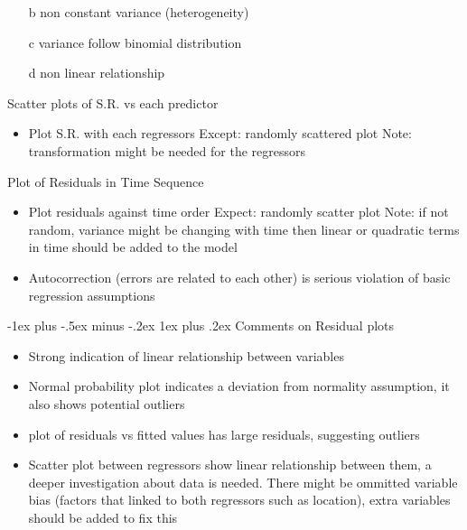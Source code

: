 \documentclass[a4paper,12pt,landscape]{article}
\makeatletter
\renewcommand{\subsubsection}{\@startsection{subsubsection}{3}{0mm}%
                                {-1ex plus -.5ex minus -.2ex}%
                                {1ex plus .2ex}%
                                {\normalfont\small\bfseries\color{violet}}}
\makeatother
\begin{document}
\begin{multicols}{3}
\begin{itemize}
            \item[b] non constant variance (heterogeneity)
            \item[c] variance follow binomial distribution
            \item[d] non linear relationship
        \end{itemize}
        Scatter plots of S.R. vs each predictor
        \begin{itemize}
            \item Plot S.R. with each regressors
                \subitem Except: randomly scattered plot
                \subitem Note: transformation might be needed for the regressors
        \end{itemize}
        Plot of Residuals in Time Sequence
        \begin{itemize}
            \item Plot residuals against time order
            \subitem Expect: randomly scatter plot
            \subitem Note: if not random, variance might be changing with time then linear or quadratic terms in time should be added to the model
        \item Autocorrection (errors are related to each other) is serious violation of basic regression assumptions
        \end{itemize}

        \subsubsection{Comments on Residual plots}
        \begin{itemize}
            \item Strong indication of linear relationship between variables
            \item Normal probability plot indicates a deviation from normality assumption, it also shows potential outliers
            \item plot of residuals vs fitted values has large residuals, suggesting outliers
            \item Scatter plot between regressors show linear relationship between them, a deeper investigation about data is needed. There might be ommitted variable bias (factors that linked to both regressors such as location), extra variables should be added to fix this
        \end{itemize}


\end{multicols}
\end{document}

